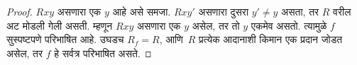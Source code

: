 \documentclass[../../../include/open-logic-section]{subfiles}
\begin{document}
\begin{proof}
$Rxy$ असणारा एक $y$ आहे असे समजा. $Rxy'$ असणारा दुसरा
$y' \neq y$ असता, तर $R$ वरील अट मोडली गेली असती. म्हणून
$Rxy$ असणारा एक $y$ असेल, तर तो $y$ एकमेव असतो. त्यामुळे $f$
सुस्पष्टपणे परिभाषित आहे. उघडच $R_f = R$, आणि~$R$ प्रत्येक आदानाशी
किमान एक प्रदान जोडत असेल, तर $f$ हे सर्वत्र परिभाषित असते.
\end{proof}
\end{document}
